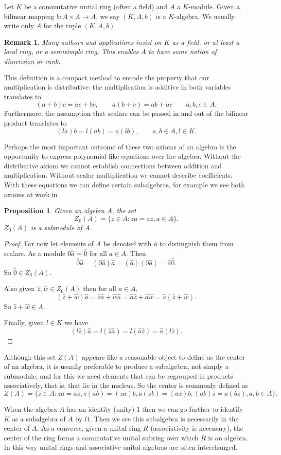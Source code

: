 \documentclass[12pt]{article}
\newtheorem{prop}[thm]{Proposition}
\newtheorem{remark}[thm]{Remark}
\begin{document}
Let $K$ be a commutative unital ring (often a field) and $A$ a $K$-module.  
Given a bilinear mapping $b:A\times A\rightarrow A$, we say $(K,A,b)$ is a $K$-algebra.  We usually write only $A$ for the tuple $(K,A,b)$.

\begin{remark}
Many authors and applications insist on $K$ as a field, or at least a local
ring, or a semisimple ring.  This enables $A$ to have some notion of dimension
or rank.
\end{remark}

This definition is a compact method to encode the property that our multiplication is distributive: the multiplication is additive in both variables translates to
  \[(a+b)c=ac+bc,\qquad a(b+c)=ab+ac\qquad a,b,c\in A.\]
Furthermore, the assumption that scalars can be passed in and out of the bilinear
product translates to
  \[(la)b=l(ab)=a(lb),\qquad a,b\in A, l\in K.\]

Perhaps the most important outcome of these two axioms of an algebra is the 
opportunity to express polynomial like equations over the algebra.  Without the distributive axiom we cannot establish connections between addition and multiplication.  Without scalar multiplication we cannot describe coefficients.
With these equations we can define certain subalgebras, for example we 
see both axioms at work in

\begin{prop}
Given an algebra $A$, the set 
\[Z_0(A)=\{z\in A: za=az, a\in A\}.\]
$Z_0(A)$ is a submodule of $A$.
\end{prop}
\begin{proof}
For now let elements of $A$ be denoted with $\hat{a}$ to distinguish them
from scalars.  As a module $0\hat{a}=\hat{0}$ for all $a\in A$.  Then
\[\hat{0}\hat{a}=(0\hat{a})\hat{a}=(\hat{a})(0\hat{a})=\hat{a}\hat{0}.\]
So $\hat{0}\in Z_0(A)$.

Also given $\hat{z},\hat{w}\in Z_0(A)$ then for all $a\in A$,
\[(\hat{z}+\hat{w})\hat{a}=\hat{z}\hat{a}+\hat{w}\hat{a}
    =\hat{a}\hat{z}+\hat{a}\hat{w}=\hat{a}(\hat{z}+\hat{w}).\]
So $\hat{z}+\hat{w}\in A$.  

Finally, given $l\in K$ we have 
\[(l\hat{z})\hat{a}=l(\hat{z}\hat{a})=l(\hat{a}\hat{z})=\hat{a}(l\hat{z}).\]
\end{proof}

Although this set $Z(A)$ appears like a reasonable object to define as the 
center of an algebra, it is usually preferable to produce a subalgebra, not
simply a submodule, and for this we need elements that can be regrouped in products associatively, that is, that lie in the nucleus.  So the center is commonly defined as
\[Z(A)=\{z\in A: za=az, z(ab)=(za)b, a(zb)=(az)b, (ab)z=a(bz), a,b\in A\}.\]

When the algebra $A$ has an identity (unity) $1$ then we can go further to identify $K$ as a subalgebra of $A$ by $l1$.  Then we see this subalgebra is
necessarily in the center of $A$.  As a converse, given a unital ring $R$ (associativity is necessary), the center of the ring forms a commutative unital subring over which $R$ is an algebra.  In this way unital rings and associative unital algebras are often interchanged.


\end{document}
